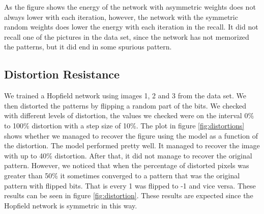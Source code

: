 \documentclass[a4paper]{article}
\begin{document}
As the figure shows the energy of the network with asymmetric weights does not always lower with each iteration, however, the network with the symmetric random weights does lower the energy with each iteration in the recall. It did not recall one of the pictures in the data set, since the network has not memorized the patterns, but it did end in some spurious pattern.

\subsection{Distortion Resistance}
We trained a Hopfield network using images 1, 2 and 3 from the data set. We then distorted the patterns by flipping a random part of the bits. We checked with different levels of distortion, the values we checked were on the interval 0\% to 100\% distortion with a step size of 10\%. The plot in figure \ref{fig:distortions} shows whether we managed to recover the figure using the model as a function of the distortion. The model performed pretty well. It managed to recover the image with up to 40\% distortion. After that, it did not manage to recover the original pattern. However, we noticed that when the percentage of distorted pixels was greater than 50\% it sometimes converged to a pattern that was the original pattern with flipped bits. That is every 1 was flipped to -1 and vice versa. These results can be seen in figure \ref{fig:distortion}. These results are expected since the Hopfield network is symmetric in this way.
\end{document}
